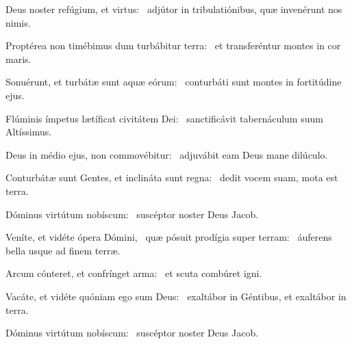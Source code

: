 \item Deus noster refúgium, et virtus:~\psstar{} adjútor in tribulatiónibus, quæ invenérunt nos nimis.

\item Proptérea non timébimus dum turbábitur terra:~\psstar{} et transferéntur montes in cor maris.

\item Sonuérunt, et turbátæ sunt aquæ eórum:~\psstar{} conturbáti sunt montes in fortitúdine ejus.

\item Flúminis ímpetus lætíficat civitátem Dei:~\psstar{} sanctificávit tabernáculum suum Altíssimus.

\item Deus in médio ejus, non commovébitur:~\psstar{} adjuvábit eam Deus mane dilúculo.

\item Conturbátæ sunt Gentes, et inclináta sunt regna:~\psstar{} dedit vocem suam, mota est terra.

\item Dóminus virtútum nobíscum:~\psstar{} suscéptor noster Deus Jacob.

\item Veníte, et vidéte ópera Dómini,~\pscross{} quæ pósuit prodígia super terram:~\psstar{} áuferens bella usque ad finem terræ.

\item Arcum cónteret, et confrínget arma:~\psstar{} et scuta combúret igni.

\item Vacáte, et vidéte quóniam ego sum Deus:~\psstar{} exaltábor in Géntibus, et exaltábor in terra.

\item Dóminus virtútum nobíscum:~\psstar{} suscéptor noster Deus Jacob.
